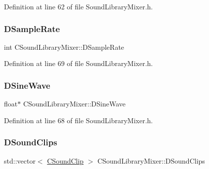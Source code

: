 Definition at line 62 of file Sound\+Library\+Mixer.\+h.

\hypertarget{classCSoundLibraryMixer_af2d94eb0c2b55d92ff00d18a25cbed6a}{}\label{classCSoundLibraryMixer_af2d94eb0c2b55d92ff00d18a25cbed6a} 
\subsubsection{\texorpdfstring{D\+Sample\+Rate}{DSampleRate}}
{\footnotesize\ttfamily int C\+Sound\+Library\+Mixer\+::\+D\+Sample\+Rate\hspace{0.3cm}{\ttfamily [protected]}}



Definition at line 69 of file Sound\+Library\+Mixer.\+h.

\hypertarget{classCSoundLibraryMixer_a7d696c93362c862bfc651a28ee8f67cf}{}\label{classCSoundLibraryMixer_a7d696c93362c862bfc651a28ee8f67cf} 
\subsubsection{\texorpdfstring{D\+Sine\+Wave}{DSineWave}}
{\footnotesize\ttfamily float$\ast$ C\+Sound\+Library\+Mixer\+::\+D\+Sine\+Wave\hspace{0.3cm}{\ttfamily [protected]}}



Definition at line 68 of file Sound\+Library\+Mixer.\+h.

\hypertarget{classCSoundLibraryMixer_af4a006eacdcd590fad6e02cddaf197c2}{}\label{classCSoundLibraryMixer_af4a006eacdcd590fad6e02cddaf197c2} 
\subsubsection{\texorpdfstring{D\+Sound\+Clips}{DSoundClips}}
{\footnotesize\ttfamily std\+::vector$<$ \hyperlink{classCSoundClip}{C\+Sound\+Clip} $>$ C\+Sound\+Library\+Mixer\+::\+D\+Sound\+Clips\hspace{0.3cm}{\ttfamily [protected]}}



